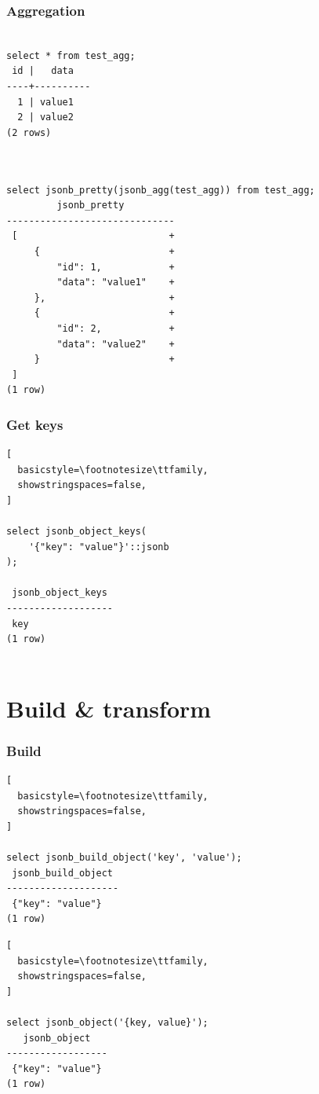 \documentclass[14pt, compress]{beamer}
\begin{document}
\begin{frame}[fragile]
  \frametitle{Aggregation}

  \vspace{-20pt}
\begin{lstlisting}[]

select * from test_agg;
 id |   data   
----+----------
  1 | value1
  2 | value2
(2 rows)
         
\end{lstlisting}

\begin{lstlisting}[]

select jsonb_pretty(jsonb_agg(test_agg)) from test_agg;
         jsonb_pretty         
------------------------------
 [                           +
     {                       +
         "id": 1,            +
         "data": "value1"    +
     },                      +
     {                       +
         "id": 2,            +
         "data": "value2"    +
     }                       +
 ]
(1 row)

\end{lstlisting}

\end{frame}

\begin{frame}[fragile]
  \frametitle{Get keys}

\begin{lstlisting}[
  basicstyle=\footnotesize\ttfamily,
  showstringspaces=false,
]

select jsonb_object_keys(
    '{"key": "value"}'::jsonb
);

 jsonb_object_keys 
-------------------
 key
(1 row)
         
\end{lstlisting}

\end{frame}

\section{Build \& transform}

\begin{frame}[fragile]
  \frametitle{Build}

\begin{lstlisting}[
  basicstyle=\footnotesize\ttfamily,
  showstringspaces=false,
]

select jsonb_build_object('key', 'value');
 jsonb_build_object 
--------------------
 {"key": "value"}
(1 row)

\end{lstlisting}

\begin{lstlisting}[
  basicstyle=\footnotesize\ttfamily,
  showstringspaces=false,
]

select jsonb_object('{key, value}');
   jsonb_object   
------------------
 {"key": "value"}
(1 row)

\end{lstlisting}

\end{frame}
\end{document}
